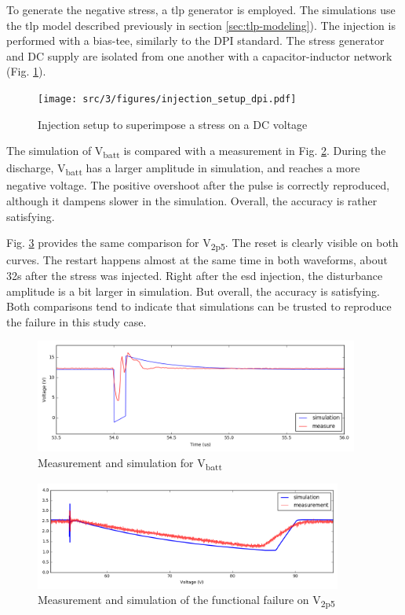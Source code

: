 To generate the negative stress, a \gls{tlp} generator is employed.
The simulations use the \gls{tlp} model described previously in section \ref{sec:tlp-modeling}).
The injection is performed with a \gls{bias-tee}, similarly to the DPI standard.
The stress generator and DC supply are isolated from one another with a capacitor-inductor network (Fig. \ref{fig:injection-setup-dpi}).

\begin{figure}[!h]
  \centering
  \texttt{[image: src/3/figures/injection\_setup\_dpi.pdf]}
  \caption{Injection setup to superimpose a stress on a DC voltage}
  \label{fig:injection-setup-dpi}
\end{figure}


The simulation of V\textsubscript{batt} is compared with a measurement in Fig. \ref{fig:wvf-vbatt}.
During the discharge, V\textsubscript{batt} has a larger amplitude in simulation, and reaches a more negative voltage.
The positive overshoot after the pulse is correctly reproduced, although it dampens slower in the simulation.
Overall, the accuracy is rather satisfying.

Fig. \ref{fig:wvf-v2p5} provides the same comparison for V\textsubscript{2p5}.
The reset is clearly visible on both curves.
The restart happens almost at the same time in both waveforms, about 32\textmu{}s after the stress was injected.
Right after the \gls{esd} injection, the disturbance amplitude is a bit larger in simulation.
But overall, the accuracy is satisfying.
Both comparisons tend to indicate that simulations can be trusted to reproduce the failure in this study case.

\begin{figure}[!h]
  \centering
  \includegraphics[width=0.95\textwidth]{src/3/figures/vbatt.png}
  \caption{Measurement and simulation for V\textsubscript{batt}}
  \label{fig:wvf-vbatt}
\end{figure}

\begin{figure}[!h]
  \centering
  \includegraphics[width=0.9\textwidth]{src/3/figures/v2p5.png}
  \caption{Measurement and simulation of the functional failure on V\textsubscript{2p5}}
  \label{fig:wvf-v2p5}
\end{figure}

